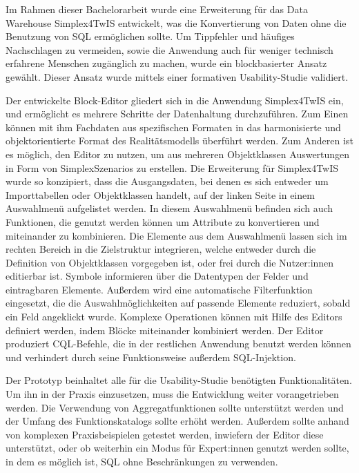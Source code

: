 Im Rahmen dieser Bachelorarbeit wurde eine Erweiterung für das Data Warehouse Simplex4TwIS entwickelt, was die Konvertierung von Daten ohne die Benutzung von \acs{SQL} ermöglichen sollte. Um Tippfehler und häufiges Nachschlagen zu vermeiden, sowie die Anwendung auch für weniger technisch erfahrene Menschen zugänglich zu machen, wurde ein blockbasierter Ansatz gewählt. Dieser Ansatz wurde mittels einer formativen Usability-Studie validiert.

\pskip
Der entwickelte Block-Editor gliedert sich in die Anwendung Simplex4TwIS ein, und ermöglicht es mehrere Schritte der Datenhaltung durchzuführen. Zum Einen können mit ihm Fachdaten aus spezifischen Formaten in das harmonisierte und objektorientierte Format des Realitätsmodells überführt werden. Zum Anderen ist es möglich, den Editor zu nutzen, um aus mehreren Objektklassen Auswertungen in Form von SimplexSzenarios zu erstellen. Die Erweiterung für Simplex4TwIS wurde so konzipiert, dass die Ausgangsdaten, bei denen es sich entweder um Importtabellen oder Objektklassen handelt, auf der linken Seite in einem Auswahlmenü aufgelistet werden. In diesem Auswahlmenü befinden sich auch Funktionen, die genutzt werden können um Attribute zu konvertieren und miteinander zu kombinieren. Die Elemente aus dem Auswahlmenü lassen sich im rechten Bereich in die Zielstruktur integrieren, welche entweder durch die Definition von Objektklassen vorgegeben ist, oder frei durch die Nutzer:innen editierbar ist. Symbole informieren über die Datentypen der Felder und eintragbaren Elemente. Außerdem wird eine automatische Filterfunktion eingesetzt, die die Auswahlmöglichkeiten auf passende Elemente reduziert, sobald ein Feld angeklickt wurde. Komplexe Operationen können mit Hilfe des Editors definiert werden, indem Blöcke miteinander kombiniert werden. Der Editor produziert \ac{CQL}-Befehle, die in der restlichen Anwendung benutzt werden können und verhindert durch seine Funktionsweise außerdem \ac{SQL}-Injektion.

Der Prototyp beinhaltet alle für die Usability-Studie benötigten Funktionalitäten. Um ihn in der Praxis einzusetzen, muss die Entwicklung weiter vorangetrieben werden. Die Verwendung von Aggregatfunktionen sollte unterstützt werden und der Umfang des Funktionskatalogs sollte erhöht werden. Außerdem sollte anhand von komplexen Praxisbeispielen getestet werden, inwiefern der Editor diese unterstützt, oder ob weiterhin ein Modus für Expert:innen genutzt werden sollte, in dem es möglich ist, \ac{SQL} ohne Beschränkungen zu verwenden.

